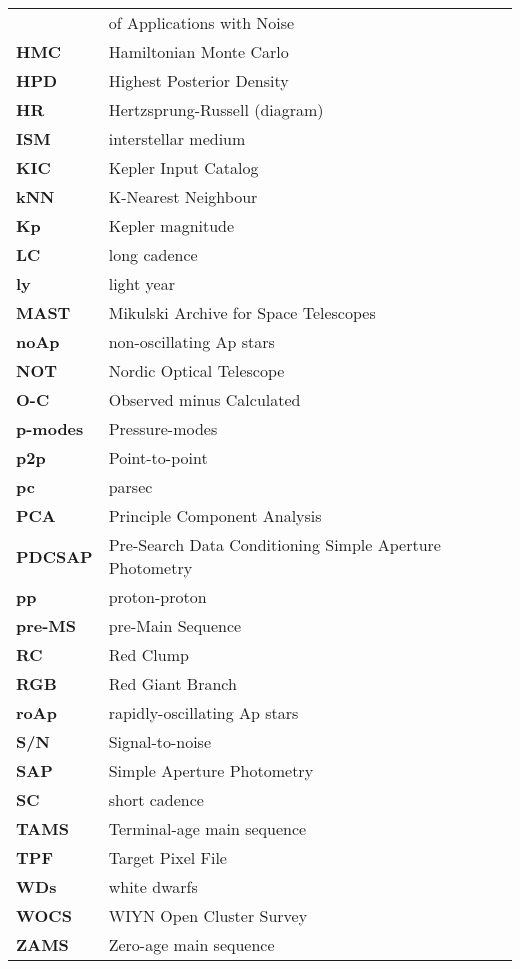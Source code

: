 {\begin{longtable}{ll}
                            &   of Applications with Noise	\\
\textbf{HMC}				&	Hamiltonian Monte Carlo	\\
\textbf{HPD}				&	Highest Posterior Density	\\
\textbf{HR}					&	Hertzsprung-Russell (diagram)	\\
\textbf{ISM}				&	interstellar medium	\\
\textbf{KIC}				&	Kepler Input Catalog	\\
\textbf{kNN}				&	K-Nearest Neighbour	\\
\textbf{Kp}					&	Kepler magnitude	\\
\textbf{LC}					&	long cadence	\\
\textbf{ly}					&	light year	\\
\textbf{MAST}				&	Mikulski Archive for Space Telescopes	\\
\textbf{noAp}				&	non-oscillating Ap stars	\\
\textbf{NOT}				&	Nordic Optical Telescope	\\
\textbf{O-C}				&	Observed minus Calculated	\\
\textbf{p-modes}			&	Pressure-modes	\\
\textbf{p2p}				&	Point-to-point	\\
\textbf{pc}					&	parsec	\\
\textbf{PCA}				&	Principle Component Analysis	\\
\textbf{PDCSAP}				&	Pre-Search Data Conditioning Simple Aperture Photometry	\\
\textbf{pp}					&	proton-proton	\\
\textbf{pre-MS}				&	pre-Main Sequence	\\
\textbf{RC}					&	Red Clump	\\
\textbf{RGB}				&	Red Giant Branch	\\
\textbf{roAp}				&	rapidly-oscillating Ap stars	\\
\textbf{S/N}				&	Signal-to-noise	\\
\textbf{SAP}				&	Simple Aperture Photometry	\\
\textbf{SC}					&	short cadence	\\
\textbf{TAMS}				&	Terminal-age main sequence	\\
\textbf{TPF}				&	Target Pixel File	\\
\textbf{WDs}				&	white dwarfs	\\
\textbf{WOCS}				&	WIYN Open Cluster Survey	\\
\textbf{ZAMS}				&	Zero-age main sequence	\\


\end{longtable}
}